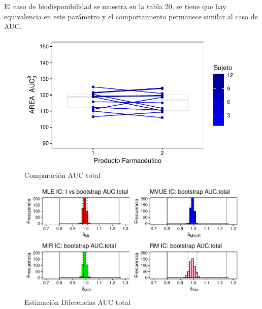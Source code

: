 \documentclass[]{article}
\begin{document}
El caso de biodisponibilidad se muestra en la tabla 20, se tiene que hay
equivalencia en este parámetro y el comportamiento permanece similar al
caso de AUC.

\begin{figure}[H]

{\centering \includegraphics{parcial_1_files/figure-latex/unnamed-chunk-32-1} 

}

\caption{Comparación AUC total}\label{fig:unnamed-chunk-32}
\end{figure}

\begin{figure}[H]

{\centering \includegraphics{parcial_1_files/figure-latex/unnamed-chunk-33-1} 

}

\caption{Estimación Diferencias AUC total}\label{fig:unnamed-chunk-33}
\end{figure}
\end{document}
